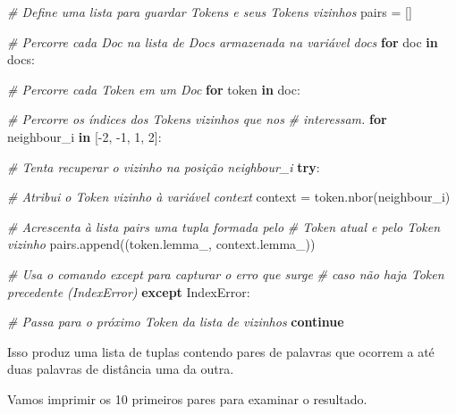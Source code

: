 \documentclass[
  brazilian,
]{article}
\newenvironment{Shaded}{}{}
\newcommand{\CommentTok}[1]{\textcolor[rgb]{0.38,0.63,0.69}{\textit{#1}}}
\newcommand{\ControlFlowTok}[1]{\textcolor[rgb]{0.00,0.44,0.13}{\textbf{#1}}}
\newcommand{\DecValTok}[1]{\textcolor[rgb]{0.25,0.63,0.44}{#1}}
\newcommand{\KeywordTok}[1]{\textcolor[rgb]{0.00,0.44,0.13}{\textbf{#1}}}
\newcommand{\NormalTok}[1]{#1}
\newcommand{\OperatorTok}[1]{\textcolor[rgb]{0.40,0.40,0.40}{#1}}
\newcommand{\PreprocessorTok}[1]{\textcolor[rgb]{0.74,0.48,0.00}{#1}}
\begin{document}
\begin{Shaded}
\begin{Highlighting}[]
\CommentTok{\# Define uma lista para guardar Tokens e seus Tokens vizinhos}
\NormalTok{pairs }\OperatorTok{=}\NormalTok{ []}

\CommentTok{\# Percorre cada Doc na lista de Docs armazenada na variável \textquotesingle{}docs\textquotesingle{}}
\ControlFlowTok{for}\NormalTok{ doc }\KeywordTok{in}\NormalTok{ docs:}

    \CommentTok{\# Percorre cada Token em um Doc}
    \ControlFlowTok{for}\NormalTok{ token }\KeywordTok{in}\NormalTok{ doc:}

        \CommentTok{\# Percorre os índices dos Tokens vizinhos que nos}
        \CommentTok{\# interessam.}
        \ControlFlowTok{for}\NormalTok{ neighbour\_i }\KeywordTok{in}\NormalTok{ [}\OperatorTok{{-}}\DecValTok{2}\NormalTok{, }\OperatorTok{{-}}\DecValTok{1}\NormalTok{, }\DecValTok{1}\NormalTok{, }\DecValTok{2}\NormalTok{]:}

            \CommentTok{\# Tenta recuperar o vizinho na posição \textquotesingle{}neighbour\_i\textquotesingle{}}
            \ControlFlowTok{try}\NormalTok{:}

                \CommentTok{\# Atribui o Token vizinho à variável \textquotesingle{}context\textquotesingle{}}
\NormalTok{                context }\OperatorTok{=}\NormalTok{ token.nbor(neighbour\_i)}

                \CommentTok{\# Acrescenta à lista \textquotesingle{}pairs\textquotesingle{} uma tupla formada pelo}
                \CommentTok{\# Token atual e pelo Token vizinho}
\NormalTok{                pairs.append((token.lemma\_, context.lemma\_))}

            \CommentTok{\# Usa o comando except para capturar o erro que surge}
            \CommentTok{\# caso não haja Token precedente (\textquotesingle{}IndexError\textquotesingle{})}
            \ControlFlowTok{except} \PreprocessorTok{IndexError}\NormalTok{:}

                \CommentTok{\# Passa para o próximo Token da lista de vizinhos}
                \ControlFlowTok{continue}
\end{Highlighting}
\end{Shaded}

Isso produz uma lista de tuplas contendo pares de palavras que ocorrem a
até duas palavras de distância uma da outra.

Vamos imprimir os 10 primeiros pares para examinar o resultado.
\end{document}
